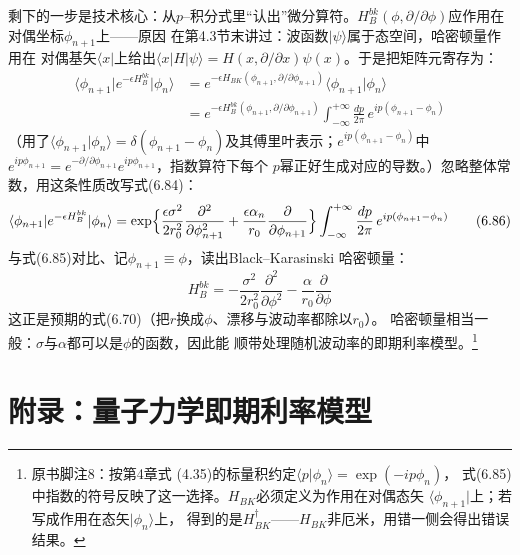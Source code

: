 剩下的一步是技术核心：从$p$--积分式里“认出”微分算符。$H_B^{bk}
(\phi,\partial/\partial\phi)$应作用在对偶坐标$\phi_{n+1}$上——原因
在第4.3节末讲过：波函数$\vert\psi\rangle$属于态空间，哈密顿量作用在
对偶基矢$\langle x\vert$上给出$\langle x\vert H\vert\psi\rangle
=H(x,\partial/\partial x)\psi(x)$。于是把矩阵元寄存为：
\begin{align*}
\langle\phi_{n+1}\vert e^{-\epsilon H_B^{bk}}\vert\phi_n\rangle
&=e^{-\epsilon H_{BK}(\phi_{n+1},\partial/\partial\phi_{n+1})}
\langle\phi_{n+1}\vert\phi_n\rangle\\
&=e^{-\epsilon H_B^{bk}(\phi_{n+1},\partial/\partial\phi_{n+1})}
\int_{-\infty}^{+\infty}\frac{dp}{2\pi}\,
e^{ip(\phi_{n+1}-\phi_n)}
\tag{6.85}
\end{align*}
（用了$\langle\phi_{n+1}\vert\phi_n\rangle=\delta(\phi_{n+1}
-\phi_n)$及其傅里叶表示；$e^{ip(\phi_{n+1}-\phi_n)}$中$e^{ip\phi_{n+1}}
=e^{-\partial/\partial\phi_{n+1}}e^{ip\phi_{n+1}}$，指数算符下每个
$p$幂正好生成对应的导数。）忽略整体常数，用这条性质改写式(6.84)：
\begin{equation*}
\langle\phi_{n+1}\vert e^{-\epsilon H_B^{bk}}\vert\phi_n\rangle
=\exp\Bigl\{\frac{\epsilon\sigma^2}{2r_0^2}
\frac{\partial^2}{\partial\phi_{n+1}^2}
+\frac{\epsilon\alpha_n}{r_0}
\frac{\partial}{\partial\phi_{n+1}}\Bigr\}
\int_{-\infty}^{+\infty}\frac{dp}{2\pi}\,e^{ip(\phi_{n+1}-\phi_n)}
\tag{6.86}
\end{equation*}
与式(6.85)对比、记$\phi_{n+1}\equiv\phi$，读出Black--Karasinski
哈密顿量：
\begin{equation*}
H_B^{bk}=-\frac{\sigma^2}{2r_0^2}\frac{\partial^2}{\partial\phi^2}
-\frac{\alpha}{r_0}\frac{\partial}{\partial\phi}
\tag{6.87}
\end{equation*}
这正是预期的式(6.70)（把$r$换成$\phi$、漂移与波动率都除以$r_0$）。
哈密顿量相当一般：$\sigma$与$\alpha$都可以是$\phi$的函数，因此能
顺带处理随机波动率的即期利率模型。\footnote{原书脚注8：按第4章式
(4.35)的标量积约定$\langle p\vert\phi_n\rangle=\exp(-ip\phi_n)$，
式(6.85)中指数的符号反映了这一选择。$H_{BK}$必须定义为作用在对偶态矢
$\langle\phi_{n+1}\vert$上；若写成作用在态矢$\vert\phi_n\rangle$上，
得到的是$H_{BK}^{\dagger}$——$H_{BK}$非厄米，用错一侧会得出错误
结果。}

\section{附录：量子力学即期利率模型}

